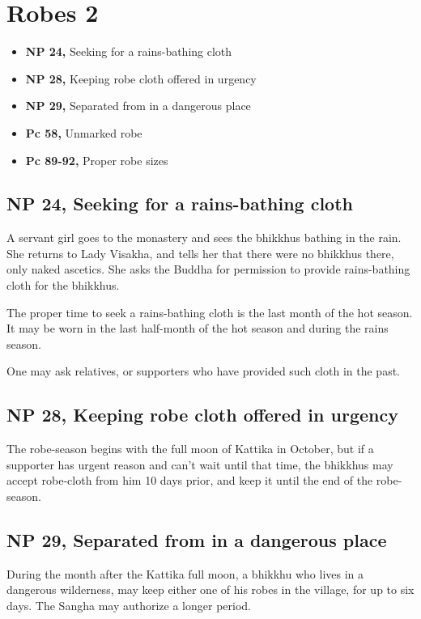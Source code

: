 \chapter{Robes 2}

\begin{itemize}
\tightlist
\item
  \textbf{NP 24,} Seeking for a rains-bathing cloth
\item
  \textbf{NP 28,} Keeping robe cloth offered in urgency
\item
  \textbf{NP 29,} Separated from in a dangerous place
\item
  \textbf{Pc 58,} Unmarked robe
\item
  \textbf{Pc 89-92,} Proper robe sizes
\end{itemize}

\section{NP 24, Seeking for a rains-bathing cloth}

A servant girl goes to the monastery and sees the bhikkhus bathing in
the rain. She returns to Lady Visakha, and tells her that there were no
bhikkhus there, only naked ascetics. She asks the Buddha for permission
to provide rains-bathing cloth for the bhikkhus.

The proper time to seek a rains-bathing cloth is the last month of the
hot season. It may be worn in the last half-month of the hot season and
during the rains season.

One may ask relatives, or supporters who have provided such cloth in the
past.

\section{NP 28, Keeping robe cloth offered in urgency}

The robe-season begins with the full moon of Kattika in October, but if
a supporter has urgent reason and can't wait until that time, the
bhikkhus may accept robe-cloth from him 10 days prior, and keep it until
the end of the robe-season.

\section{NP 29, Separated from in a dangerous place}

During the month after the Kattika full moon, a bhikkhu who lives in a
dangerous wilderness, may keep either one of his robes in the village,
for up to six days. The Sangha may authorize a longer period.

